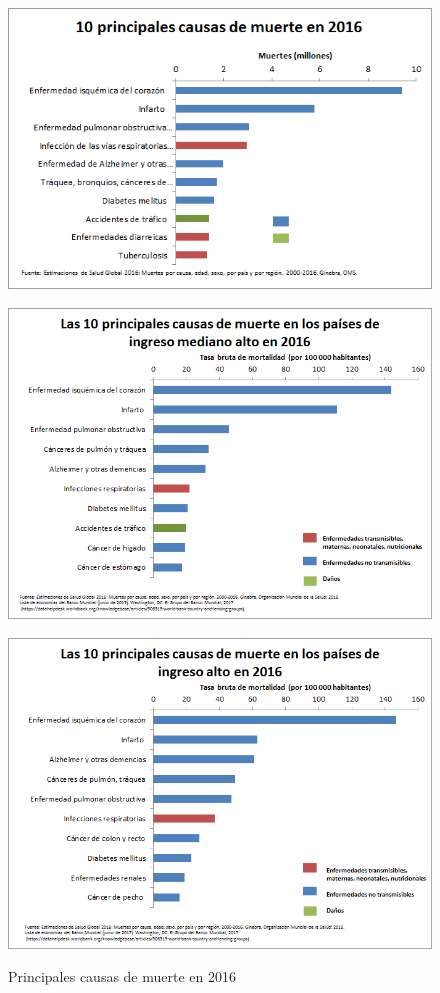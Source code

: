 \begin{figure}[ht]
    \begin{minipage}[b]{\linewidth}
        \centering
            {\includegraphics[width = .4\linewidth]{ figuras/Muertes2016.png}}
    \end{minipage}
            \begin{minipage}[b]{.5\linewidth}
        \centering
            {\includegraphics[width = .8\linewidth]{ figuras/Muertes2016MedioAlto.png}} 
    \end{minipage}
    \begin{minipage}[b]{.5\linewidth}
        \centering
            {\includegraphics[width = .8\linewidth]{ figuras/Muertes2016Alto.png}}
        \end{minipage}
    \caption{Principales causas de muerte en 2016}
    \label{fig:Muertes2016}
\end{figure}

